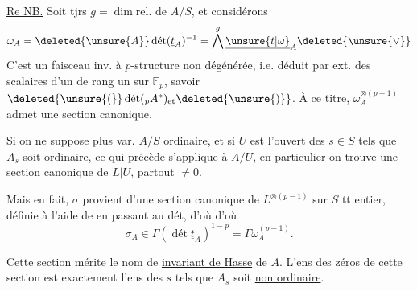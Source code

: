 \uline{Re NB.} Soit tjrs $g=\dim\mathrm{rel.}$ de $A/S$, et considérons
\[
\omega_A=\deleted{\unsure{A}}\operatorname{\text{dét}}(\underline t_A)^{-1}
=\bigwedge^g\underline{\unsure{t|\omega}}_A\deleted{\unsure{\vee}}
\]
C'est un faisceau inv. à $p$-structure non dégénérée, i.e. déduit par ext. des scalaires d'un   de rang un sur $\mathbb F_p$, savoir $\deleted{\unsure{(}}\operatorname{\text{dét}}({}_pA^*)_{\text{et}}\deleted{\unsure{)}}$. À ce titre, $\omega_A^{\otimes(p-1)}$ admet une section canonique.

Si on ne suppose plus var. $A/S$ ordinaire, et si $U$ est l'ouvert des $s\in S$ tels que $A_s$ soit ordinaire,  ce qui précède s'applique à $A/U$, en particulier on trouve une section canonique \inserted{$\sigma$} de $L\vert U$, partout $\ne0$.

Mais en fait, $\sigma$ provient d'une section canonique de $L^{\otimes(p-1)}$ sur $S$ tt entier, définie à l'aide de
en passant au dét, d'où
d'où
\[
\sigma_A\in\Gamma(\operatorname{\text{dét}}\underline t_A)^{1-p}=\Gamma\omega_A^{(p-1)}.
\]

Cette section mérite le nom de \uline{invariant de Hasse} de $A$. L'ens des zéros de cette section est exactement l'ens des $s$ tels que $A_s$ soit \uline{non ordinaire}.

